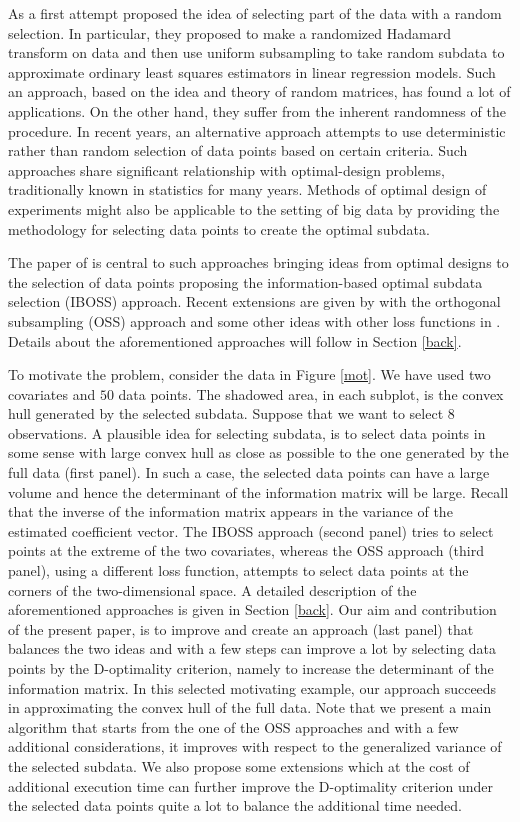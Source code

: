 \documentclass[12pt]{article}
\theoremstyle{definition}
\begin{document}
	As a first attempt \cite{drineas2011faster} proposed the idea of selecting part of the data with a random selection. In particular, they proposed to make a randomized Hadamard transform on data and then use uniform subsampling to take random subdata to approximate ordinary least squares estimators in linear regression models. Such an approach, based on the idea and theory of random matrices, has found a lot of applications. On the other hand, they suffer from the inherent randomness of the procedure. In recent years, an alternative approach attempts to use deterministic rather than random selection of data points based on certain criteria. Such approaches share significant relationship with optimal-design problems, traditionally known in statistics for many years. Methods of optimal design of experiments might also be applicable to the setting of big data by providing the methodology for selecting data points to create the optimal subdata. 
	
	The paper of \cite{wang2019information} is central to such approaches bringing ideas from optimal designs to the selection of data points proposing the information-based optimal subdata selection (IBOSS) approach. Recent extensions are given by \cite{wang2021oss} with the orthogonal subsampling (OSS) approach and some other ideas with other loss functions in \cite{ren&zhao}. Details about the aforementioned approaches will follow in Section \ref{back}.
	
	To motivate the problem, consider the data in Figure \ref{mot}. We have used two covariates and $50$ data points. The shadowed area, in each subplot, is the convex hull generated by the selected subdata. 
	Suppose that we want to select $8$ observations. 
	A plausible idea for selecting subdata, is to select data points in some sense with large convex hull as close as possible to the one generated by the full data (first panel). In such a case, the selected data points can have a large volume and hence the determinant of the information matrix will be large. Recall that the inverse of the information matrix appears in the variance of the estimated coefficient vector. The IBOSS approach (second panel) tries to select points at the extreme of the two covariates, whereas the OSS approach (third panel), using a different loss function, attempts to select data points at the corners of the two-dimensional space. A detailed description of the aforementioned approaches is given in Section \ref{back}. 
	Our aim and contribution of the present paper, is to improve and create an approach (last panel) that balances the two ideas and with a few steps can improve a lot by selecting data points by the D-optimality criterion, namely to increase the determinant of the information matrix. In this selected motivating example, our approach succeeds in approximating the convex hull of the full data. Note that we present a main algorithm that starts from the one of the OSS approaches and with a few additional considerations, it improves with respect to the generalized variance of the selected subdata. We also propose some extensions which at the cost of additional execution time can further improve the D-optimality criterion under the selected data points quite a lot to balance the additional time needed. 
	
\end{document}

